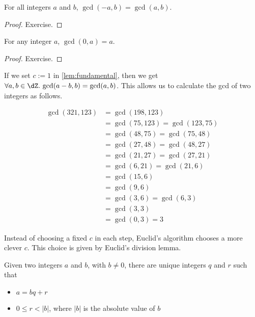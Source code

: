 \documentclass[article,10pt,oneside]{memoir}
\begin{document}
\begin{lem}\label{lem:sign}
  For all integers $a$ and $b$, $\gcd(-a, b) = \gcd(a, b)$.
\end{lem}
\begin{proof}
  Exercise.
\end{proof}

\begin{lem}\label{lem:base}
  For any integer $a$, $\gcd(0,a) = a$.
\end{lem}
\begin{proof}
  Exercise.
\end{proof}

If we set $c := 1$ in \cref{lem:fundamental}, then we get $\forall a, b \in \dZ.\,\gcd(a-b, b) = \gcd(a, b)$.
This allows us to calculate the gcd of two integers as follows.

\begin{eg}\label{eg:c-1}
  \begin{align}
    \gcd(321,123) &= \gcd(198,123)\\
                  &= \gcd(75,123) = \gcd(123,75)\\
                  &= \gcd(48,75) = \gcd(75,48)\\
                  &= \gcd(27,48) = \gcd(48,27)\\
                  &= \gcd(21,27) = \gcd(27,21)\\
                  &= \gcd(6,21) = \gcd(21,6)\\
                  &= \gcd(15,6)\\
                  &= \gcd(9,6)\\
                  &= \gcd(3,6) = \gcd(6,3)\\
                  &= \gcd(3,3)\\
                  &= \gcd(0,3) = 3
  \end{align}
\end{eg}

Instead of choosing a fixed $c$ in each step, Euclid's algorithm chooses a more clever $c$.
This choice is given by Euclid's division lemma.
\begin{lem}
  Given two integers $a$ and $b$, with $b \neq 0$, there are unique integers $q$ and $r$ such that
  \begin{itemize}
  \item $a = bq + r$
  \item $0 \leq r < |b|$, where $|b|$ is the absolute value of $b$
  \end{itemize}
\end{lem}
\end{document}
